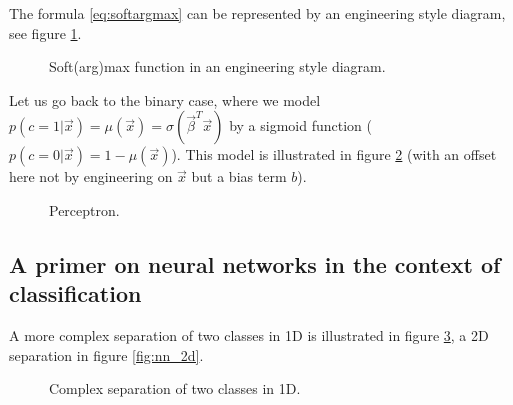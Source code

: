 The formula \ref{eq:softargmax} can be represented by an engineering style diagram, see figure \ref{fig:softargmax_engineering}.

\begin{figure}[!htb]
    \centering
    
    \caption{Soft(arg)max function in an engineering style diagram.}
    \label{fig:softargmax_engineering}
\end{figure}


Let us go back to the binary case, where we model $p(c = 1 | \vec{x}) = \mu(\vec{x}) = \sigma(\vec{\beta}^T \vec{x})$
by a sigmoid function ($p(c = 0 | \vec{x}) = 1 - \mu(\vec{x})$). This model is illustrated in figure \ref{fig:perceptron}
(with an offset here not by engineering on $\vec{x}$ but a bias term $b$).

\begin{figure}[!htb]
    \centering
    
    \caption{Perceptron.}
    \label{fig:perceptron}
\end{figure}


\subsection{A primer on neural networks in the context of classification}

A more complex separation of two classes in 1D is illustrated in figure \ref{fig:nn_1d},
a 2D separation in figure \ref{fig:nn_2d}.

\begin{figure}[!htb]
    \centering
    
    \caption{Complex separation of two classes in 1D.}
    \label{fig:nn_1d}
\end{figure}

